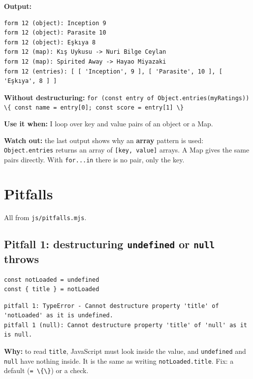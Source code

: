 \documentclass[
]{article}
\newcommand{\passthrough}[1]{#1}
\begin{document}
\textbf{Output:}

\begin{lstlisting}
form 12 (object): Inception 9
form 12 (object): Parasite 10
form 12 (object): Eşkıya 8
form 12 (map): Kış Uykusu -> Nuri Bilge Ceylan
form 12 (map): Spirited Away -> Hayao Miyazaki
form 12 (entries): [ [ 'Inception', 9 ], [ 'Parasite', 10 ], [ 'Eşkıya', 8 ] ]
\end{lstlisting}

\textbf{Without destructuring:}
\passthrough{\lstinline!for (const entry of Object.entries(myRatings)) \{ const name = entry[0]; const score = entry[1] \}!}

\textbf{Use it when:} I loop over key and value pairs of an object or a
Map.

\textbf{Watch out:} the last output shows why an \textbf{array} pattern
is used: \passthrough{\lstinline!Object.entries!} returns an array of
\passthrough{\lstinline![key, value]!} arrays. A Map gives the same
pairs directly. With \passthrough{\lstinline!for...in!} there is no
pair, only the key.

\hypertarget{pitfalls}{%
\section{Pitfalls}\label{pitfalls}}

All from \passthrough{\lstinline!js/pitfalls.mjs!}.

\hypertarget{pitfall-1-destructuring-undefined-or-null-throws}{%
\subsection{\texorpdfstring{Pitfall 1: destructuring \texttt{undefined}
or \texttt{null}
throws}{Pitfall 1: destructuring undefined or null throws}}\label{pitfall-1-destructuring-undefined-or-null-throws}}

\begin{lstlisting}
const notLoaded = undefined
const { title } = notLoaded
\end{lstlisting}

\begin{lstlisting}
pitfall 1: TypeError - Cannot destructure property 'title' of 'notLoaded' as it is undefined.
pitfall 1 (null): Cannot destructure property 'title' of 'null' as it is null.
\end{lstlisting}

\textbf{Why:} to read \passthrough{\lstinline!title!}, JavaScript must
look inside the value, and \passthrough{\lstinline!undefined!} and
\passthrough{\lstinline!null!} have nothing inside. It is the same as
writing \passthrough{\lstinline!notLoaded.title!}. Fix: a default
(\passthrough{\lstinline!= \{\}!}) or a check.
\end{document}
